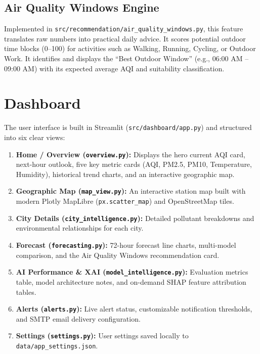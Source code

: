 \documentclass[12pt,a4paper]{article}
\begin{document}
\subsection{Air Quality Windows Engine}
Implemented in \texttt{src/recommendation/air\_quality\_windows.py}, this feature translates raw numbers into practical daily advice. It scores potential outdoor time blocks (0--100) for activities such as Walking, Running, Cycling, or Outdoor Work. It identifies and displays the ``Best Outdoor Window'' (e.g., 06:00 AM -- 09:00 AM) with its expected average AQI and suitability classification.

\section{Dashboard}

The user interface is built in Streamlit (\texttt{src/dashboard/app.py}) and structured into six clear views:
\begin{enumerate}
    \item \textbf{Home / Overview (\texttt{overview.py}):} Displays the hero current AQI card, next-hour outlook, five key metric cards (AQI, PM2.5, PM10, Temperature, Humidity), historical trend charts, and an interactive geographic map.
    \item \textbf{Geographic Map (\texttt{map\_view.py}):} An interactive station map built with modern Plotly MapLibre (\texttt{px.scatter\_map}) and OpenStreetMap tiles.
    \item \textbf{City Details (\texttt{city\_intelligence.py}):} Detailed pollutant breakdowns and environmental relationships for each city.
    \item \textbf{Forecast (\texttt{forecasting.py}):} 72-hour forecast line charts, multi-model comparison, and the Air Quality Windows recommendation card.
    \item \textbf{AI Performance \& XAI (\texttt{model\_intelligence.py}):} Evaluation metrics table, model architecture notes, and on-demand SHAP feature attribution tables.
    \item \textbf{Alerts (\texttt{alerts.py}):} Live alert status, customizable notification thresholds, and SMTP email delivery configuration.
    \item \textbf{Settings (\texttt{settings.py}):} User settings saved locally to \texttt{data/app\_settings.json}.
\end{enumerate}
\end{document}
